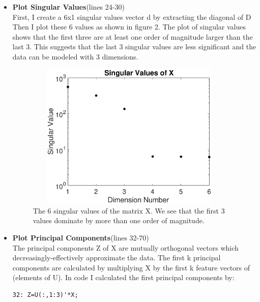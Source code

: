 \documentclass{article}
\begin{document}
\begin{itemize}
    \item \textbf{Plot Singular Values}(lines 24-30) \\
    First, I create a 6x1 singular values vector d by extracting the diagonal of D\\
    Then I plot these 6 values as shown in figure 2.  The plot of singular values shows that the first three are at least one order of magnitude larger than the last 3.  This suggests that the last 3 singular values are less significant and the data can be modeled with 3 dimensions.  \\
    \begin{figure}[h!]
        \centerline
        {
        \includegraphics[width=10cm, height=7cm] {Q_1_b_singular_values}
        }
        \caption{\label{fig:my figure} The 6 singular values of the matrix X.  We see that the first 3 values dominate by more than one order of magnitude. }
    \end{figure}

    \item \textbf{Plot Principal Components}(lines 32-70)\\
    The principal components Z of X are mutually orthogonal vectors which decreasingly-effectively approximate the data.  The first k principal components are calculated by multiplying X by the first k feature vectors of (elements of U).  In code I calculated the first principal components by:
    \begin{verbatim}32: Z=U(:,1:3)'*X;\end{verbatim}


\end{itemize}
\end{document}
